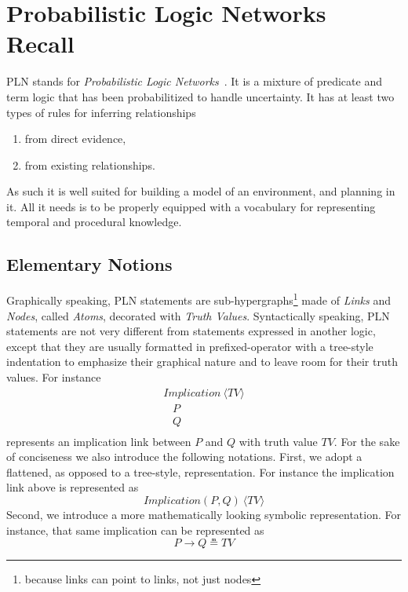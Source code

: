 \documentclass[runningheads]{llncs}
\newcommand{\SP}{\;\;\;}
\newcommand{\TImpl}{\textit{Implication}}
\newcommand{\TTV}{\textit{TV}}
\newcommand{\TBTV}{\langle \TTV \rangle}
\newcommand{\limp}{\rightarrow}
\begin{document}
\section{Probabilistic Logic Networks Recall}
\label{sec:recall}
PLN stands for \emph{Probabilistic Logic
  Networks}~\cite{Goertzel09PLN}.  It is a mixture of predicate and
term logic that has been probabilitized to handle uncertainty.  It has
at least two types of rules for inferring relationships
\begin{enumerate}
\item from direct evidence,
\item from existing relationships.
\end{enumerate}
As such it is well suited for building a model of an environment, and
planning in it.  All it needs is to be properly equipped with a
vocabulary for representing temporal and procedural knowledge.

\subsection{Elementary Notions}


%
%
%


Graphically speaking, PLN statements are
sub-hypergraphs\footnote{because links can point to links, not just
  nodes} made of \emph{Links} and \emph{Nodes}, called \emph{Atoms},
decorated with \emph{Truth Values}.  Syntactically speaking, PLN
statements are not very different from statements expressed in another
logic, except that they are usually formatted in prefixed-operator
with a tree-style indentation to emphasize their graphical nature and
to leave room for their truth values.  For instance
$$
\begin{array}{l}
  \TImpl\ \TBTV\\
  \SP P\\
  \SP Q\\
\end{array}
$$
represents an implication link between $P$ and $Q$ with truth value
$\TTV$.  For the sake of conciseness we also introduce the following
notations.  First, we adopt a flattened, as opposed to a tree-style,
representation.  For instance the implication link above is
represented as
$$\TImpl(P, Q)\ \TBTV$$
Second, we introduce a more mathematically looking symbolic
representation.  For instance, that same implication can be
represented as
$$P \limp Q \measeq \TTV$$
\end{document}
